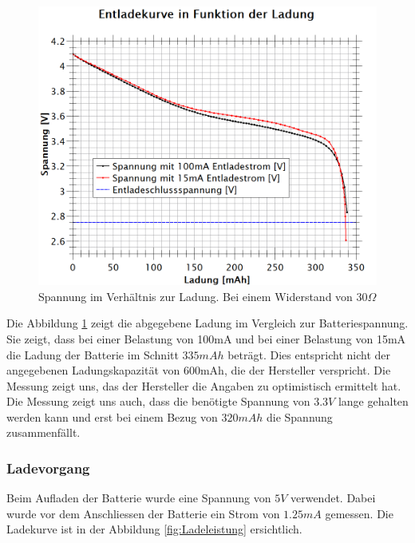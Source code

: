 \begin{figure}[h]
	\centering
	\includegraphics[width=\textwidth]{graphics/SpannungzuLadung.png}
	\caption{Spannung im Verhältnis zur Ladung. Bei einem Widerstand von 30$\Omega$}
	\label{fig:SpannungZuLadung}
\end{figure}

Die Abbildung \ref{fig:SpannungZuLadung} zeigt die abgegebene Ladung im Vergleich zur Batteriespannung. Sie zeigt, dass bei einer Belastung von 100mA und bei einer Belastung von 15mA die Ladung der Batterie im Schnitt $335mAh$ beträgt. Dies entspricht nicht der angegebenen Ladungskapazität von 600mAh, die der Hersteller verspricht. Die Messung zeigt uns, das der Hersteller die Angaben zu optimistisch ermittelt hat. Die Messung zeigt uns auch, dass die benötigte Spannung von $3.3V$ lange gehalten werden kann und erst bei einem Bezug von $320mAh$ die Spannung zusammenfällt.

\newpage

\subsubsection*{Ladevorgang}
\label{sec:Ladevorgang}
Beim Aufladen der Batterie wurde eine Spannung von $5V$ verwendet. Dabei wurde vor dem Anschliessen der Batterie ein Strom von $1.25mA$ gemessen. Die Ladekurve ist in der Abbildung                       \ref{fig:Ladeleistung} ersichtlich.

